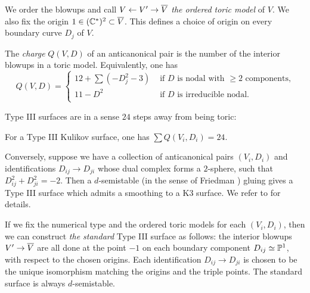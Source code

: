 \documentclass{amsart}
\begin{document}
We order the blowups and call $V \gets V' \to {\overline V}$ \emph{the ordered
  toric model} of $V$. We also fix the origin $1\in
({\mathbb C}^*)^2\subset{\overline V}$. This defines a choice of origin on every
boundary curve $D_j$ of $V$.

\begin{definition}\label{def:charge}
  The \emph{charge} $Q(V,D)$ of an anticanonical pair is 
  the number of the interior blowups in a toric model.
  Equivalently, one has
  \begin{displaymath}
    Q(V,D) =
    \begin{cases}
      12 + \sum(-D_j^2-3) &\text{ if } D \text{ is nodal with } \ge2
      \text{ components,}  \\
      11-D^2 & \text{ if } D \text{ is irreducible nodal.}\\
    \end{cases}
  \end{displaymath}
\end{definition}

Type III surfaces are in a sense $24$ steps away from being toric:

\begin{theorem}
  \label{thm:friedman-miranda}
   For a Type III Kulikov surface,
  one has $\sum Q(V_i,D_i)=24$. 
\end{theorem}

Conversely, suppose we have a collection of anticanonical pairs $(V_i,D_i)$
and identifications $D_{ij}\to D_{ji}$ whose dual complex forms a $2$-sphere,
such that $D_{ij}^2+D_{ji}^2=-2$.
Then a $d$-semistable (in the sense of Friedman
\cite{friedman1983global-smoothings}) gluing gives a
Type III surface which admits a smoothing to a  
K3 surface. We refer to \cite{alexeev2021compact} for details.

If we fix the numerical type and the ordered toric models for each
$(V_i,D_i)$, then we can construct \emph{the standard}
Type III surface as follows: the interior blowups
$V'\to{\overline V}$ are all done at the point $-1$ on each boundary component
$D_{ij}\simeq {\mathbb P}^1$,
with respect to the chosen origins. Each
identification $D_{ij}\to D_{ji}$ is chosen to be the unique
isomorphism matching the origins and the triple points. The
standard surface is always $d$-semistable.
\end{document}
